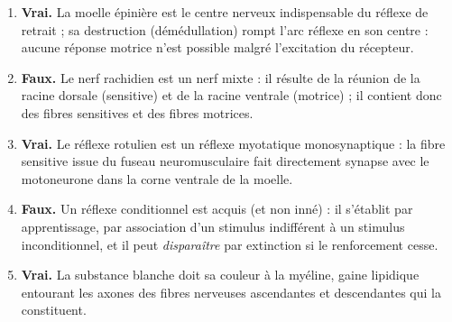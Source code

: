 \documentclass[11pt]{article}
\newcommand{\cle}[1]{{\popxbold\color{popdark}#1}}
\begin{document}
\begin{corrige}
\begin{enumerate}
\item \textbf{Vrai.} La moelle épinière est le \cle{centre nerveux} indispensable du réflexe de retrait ; sa destruction (démédullation) rompt l'arc réflexe en son centre : aucune réponse motrice n'est possible malgré l'excitation du récepteur.
\item \textbf{Faux.} Le nerf rachidien est un nerf \cle{mixte} : il résulte de la réunion de la racine dorsale (sensitive) et de la racine ventrale (motrice) ; il contient donc des fibres sensitives et des fibres motrices.
\item \textbf{Vrai.} Le réflexe rotulien est un réflexe \cle{myotatique monosynaptique} : la fibre sensitive issue du fuseau neuromusculaire fait directement synapse avec le motoneurone dans la corne ventrale de la moelle.
\item \textbf{Faux.} Un réflexe conditionnel est \cle{acquis} (et non inné) : il s'établit par apprentissage, par association d'un stimulus indifférent à un stimulus inconditionnel, et il peut \emph{disparaître} par extinction si le renforcement cesse.
\item \textbf{Vrai.} La substance blanche doit sa couleur à la \cle{myéline}, gaine lipidique entourant les axones des fibres nerveuses ascendantes et descendantes qui la constituent.
\end{enumerate}
\end{corrige}
\end{document}
